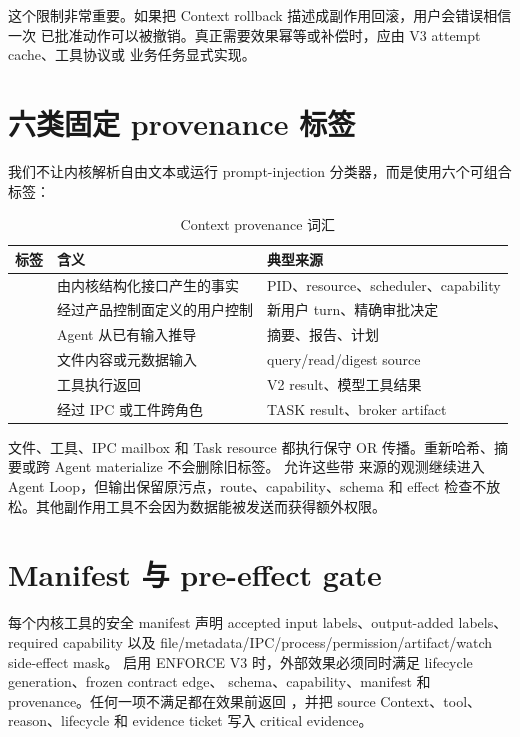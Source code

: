 这个限制非常重要。如果把 Context rollback 描述成副作用回滚，用户会错误相信一次
已批准动作可以被撤销。真正需要效果幂等或补偿时，应由 V3 attempt cache、工具协议或
业务任务显式实现。

\section{六类固定 provenance 标签}

我们不让内核解析自由文本或运行 prompt-injection 分类器，而是使用六个可组合标签：

\begin{table}[htbp]
\centering
\caption{Context provenance 词汇}
\label{tab:provenance-labels}
\begin{tabularx}{\textwidth}{L{4.2cm}Y L{4.3cm}}
\toprule
\textbf{标签} & \textbf{含义} & \textbf{典型来源} \\
\midrule
{} & 由内核结构化接口产生的事实 & PID、resource、scheduler、capability \\
 & 经过产品控制面定义的用户控制 & 新用户 turn、精确审批决定 \\
 & Agent 从已有输入推导 & 摘要、报告、计划 \\
 & 文件内容或元数据输入 & query/read/digest source \\
 & 工具执行返回 & V2 result、模型工具结果 \\
 & 经过 IPC 或工件跨角色 & TASK result、broker artifact \\
\bottomrule
\end{tabularx}
\end{table}

文件、工具、IPC mailbox 和 Task resource 都执行保守 OR 传播。重新哈希、摘要或跨 Agent
materialize 不会删除旧标签。 允许这些带
来源的观测继续进入 Agent Loop，但输出保留原污点，route、capability、schema 和 effect
检查不放松。其他副作用工具不会因为数据能被发送而获得额外权限。

\section{Manifest 与 pre-effect gate}

每个内核工具的安全 manifest 声明 accepted input labels、output-added labels、required
capability 以及 file/metadata/IPC/process/permission/artifact/watch side-effect mask。
启用 ENFORCE V3 时，外部效果必须同时满足 lifecycle generation、frozen contract edge、
schema、capability、manifest 和 provenance。任何一项不满足都在效果前返回
，并把 source Context、tool、reason、lifecycle 和 evidence ticket 写入
critical evidence。

